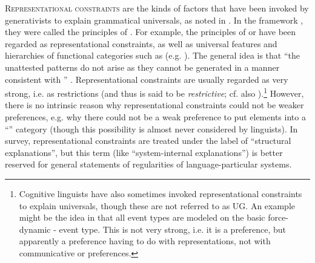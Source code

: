 \documentclass[output=paper]{langsci/langscibook}
\begin{document}
\textsc{Representational constraints} 
\label{p:haspelmath:representationalconstraints}
are the kinds of factors that have been invoked by generativists to explain grammatical universals, as noted in . In the  framework \citep{Chomsky1981}, they were called the principles of . For example, the principles of  or  have been regarded as representational constraints, as well as universal features and hierarchies of functional categories such as  (e.g. \citealt{Cinque1999}). The general idea is that “the unattested patterns do not arise as they cannot be generated in a manner consistent with ” \citep{SmithEtAl2018}. Representational constraints are usually regarded as very strong, i.e. as restrictions (and thus  is said to be \textit{restrictive}; cf. also \citealt{Haspelmath2014_CompSyn}).\footnote{Cognitive linguists have also sometimes invoked representational constraints to explain universals, though these are not referred to as UG. An example might be the idea in \citet{Croft1991} that all event types are modeled on the basic force-dynamic - event type. This is not very strong, i.e. it is a preference, but apparently a preference having to do with  representations, not with communicative or  preferences.} However, there is no intrinsic reason why representational constraints could not be weaker preferences, e.g. why there could not be a weak  preference to put elements into a “” category (though this possibility is almost never considered by linguists). In  survey, representational constraints are treated under the label of “structural explanations”, but this term (like “system-internal explanations”) is better reserved for general statements of regularities of language-particular systems.
\end{document}

